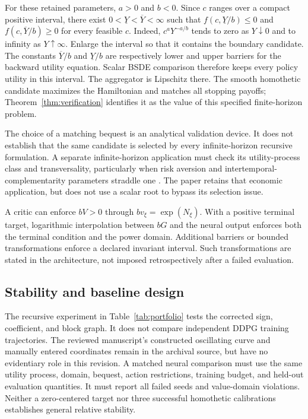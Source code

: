 \documentclass[ecta,draft]{econsocart}
\theoremstyle{definition}
\theoremstyle{remark}
\begin{document}
For these retained parameters, $a>0$ and $b<0$. Since $c$ ranges over a compact positive interval, there exist $0<\underline Y<\overline Y<\infty$ such that $f(c,\underline Y/b)\leq0$ and $f(c,\overline Y/b)\geq0$ for every feasible $c$. Indeed, $c^aY^{-a/b}$ tends to zero as $Y\downarrow0$ and to infinity as $Y\uparrow\infty$. Enlarge the interval so that it contains the boundary candidate. The constants $\overline Y/b$ and $\underline Y/b$ are respectively lower and upper barriers for the backward utility equation. Scalar BSDE comparison therefore keeps every policy utility in this interval. The aggregator is Lipschitz there. The smooth homothetic candidate maximizes the Hamiltonian and matches all stopping payoffs; Theorem~\ref{thm:verification} identifies it as the value of this specified finite-horizon problem.

The choice of a matching bequest is an analytical validation device. It does not establish that the same candidate is selected by every infinite-horizon recursive formulation. A separate infinite-horizon application must check its utility-process class and transversality, particularly when risk aversion and intertemporal-complementarity parameters straddle one \citep{herdegen2021}. The paper retains that economic application, but does not use a scalar root to bypass its selection issue.

A critic can enforce $bV>0$ through $b v_\xi=\exp(N_\xi)$. With a positive terminal target, logarithmic interpolation between $bG$ and the neural output enforces both the terminal condition and the power domain. Additional barriers or bounded transformations enforce a declared invariant interval. Such transformations are stated in the architecture, not imposed retrospectively after a failed evaluation.

\subsection{Stability and baseline design}
The recursive experiment in Table~\ref{tab:portfolio} tests the corrected sign, coefficient, and block graph. It does not compare independent DDPG training trajectories. The reviewed manuscript's constructed oscillating curve and manually entered coordinates remain in the archival source, but have no evidentiary role in this revision. A matched neural comparison must use the same utility process, domain, bequest, action restrictions, training budget, and held-out evaluation quantities. It must report all failed seeds and value-domain violations. Neither a zero-centered target nor three successful homothetic calibrations establishes general relative stability.
\end{document}
